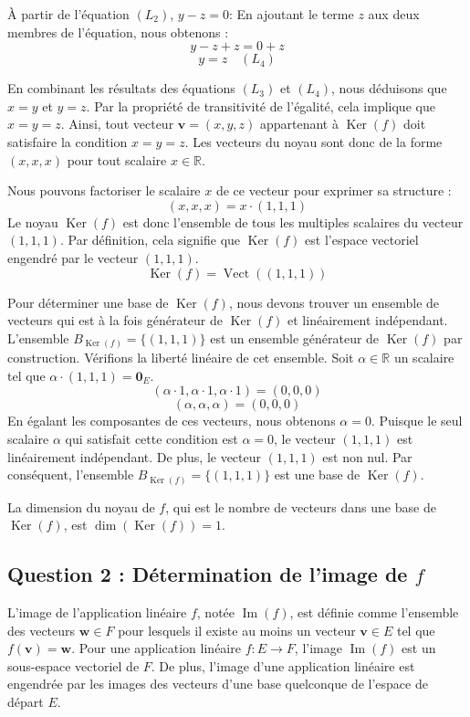 \documentclass{report}
\begin{document}
À partir de l'équation $(L_2)$, $y - z = 0$:
En ajoutant le terme $z$ aux deux membres de l'équation, nous obtenons :
$$ y - z + z = 0 + z $$
$$ y = z \quad (L_4) $$

En combinant les résultats des équations $(L_3)$ et $(L_4)$, nous déduisons que $x=y$ et $y=z$. Par la propriété de transitivité de l'égalité, cela implique que $x=y=z$.
Ainsi, tout vecteur $\mathbf{v} = (x,y,z)$ appartenant à $\operatorname{Ker}(f)$ doit satisfaire la condition $x = y = z$.
Les vecteurs du noyau sont donc de la forme $(x,x,x)$ pour tout scalaire $x \in \mathbb{R}$.

Nous pouvons factoriser le scalaire $x$ de ce vecteur pour exprimer sa structure :
$$ (x,x,x) = x \cdot (1,1,1) $$
Le noyau $\operatorname{Ker}(f)$ est donc l'ensemble de tous les multiples scalaires du vecteur $(1,1,1)$.
Par définition, cela signifie que $\operatorname{Ker}(f)$ est l'espace vectoriel engendré par le vecteur $(1,1,1)$.
$$ \operatorname{Ker}(f) = \operatorname{Vect}((1,1,1)) $$

Pour déterminer une base de $\operatorname{Ker}(f)$, nous devons trouver un ensemble de vecteurs qui est à la fois générateur de $\operatorname{Ker}(f)$ et linéairement indépendant.
L'ensemble $B_{\operatorname{Ker}(f)} = \{ (1,1,1) \}$ est un ensemble générateur de $\operatorname{Ker}(f)$ par construction.
Vérifions la liberté linéaire de cet ensemble. Soit $\alpha \in \mathbb{R}$ un scalaire tel que $\alpha \cdot (1,1,1) = \mathbf{0}_E$.
$$ (\alpha \cdot 1, \alpha \cdot 1, \alpha \cdot 1) = (0,0,0) $$
$$ (\alpha, \alpha, \alpha) = (0,0,0) $$
En égalant les composantes de ces vecteurs, nous obtenons $\alpha = 0$.
Puisque le seul scalaire $\alpha$ qui satisfait cette condition est $\alpha = 0$, le vecteur $(1,1,1)$ est linéairement indépendant.
De plus, le vecteur $(1,1,1)$ est non nul.
Par conséquent, l'ensemble $B_{\operatorname{Ker}(f)} = \{ (1,1,1) \}$ est une base de $\operatorname{Ker}(f)$.

La dimension du noyau de $f$, qui est le nombre de vecteurs dans une base de $\operatorname{Ker}(f)$, est $\dim(\operatorname{Ker}(f)) = 1$.

\subsection*{Question 2 : Détermination de l'image de $f$}

L'image de l'application linéaire $f$, notée $\operatorname{Im}(f)$, est définie comme l'ensemble des vecteurs $\mathbf{w} \in F$ pour lesquels il existe au moins un vecteur $\mathbf{v} \in E$ tel que $f(\mathbf{v}) = \mathbf{w}$.
Pour une application linéaire $f: E \to F$, l'image $\operatorname{Im}(f)$ est un sous-espace vectoriel de $F$.
De plus, l'image d'une application linéaire est engendrée par les images des vecteurs d'une base quelconque de l'espace de départ $E$.
\end{document}
